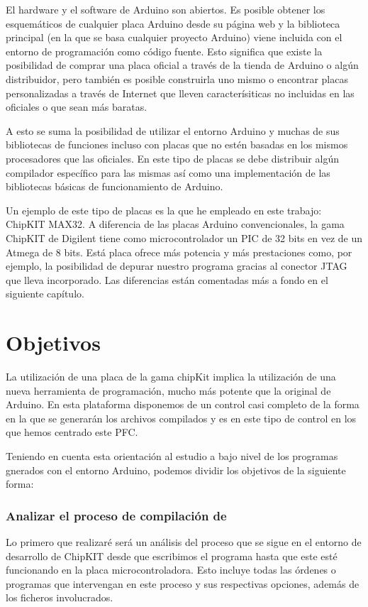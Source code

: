 El hardware y el software de Arduino son abiertos.  Es posible obtener los esquemáticos de cualquier placa Arduino desde su página web y la biblioteca principal (en la que se basa cualquier proyecto Arduino) viene incluida con el entorno de programación como código fuente.  Esto significa que existe la posibilidad de comprar una placa oficial a través de la tienda de Arduino o algún distribuidor, pero también es posible construirla uno mismo o encontrar placas personalizadas a través de Internet que lleven caracterísiticas no incluidas en las oficiales o que sean más baratas.

A esto se suma la posibilidad de utilizar el entorno Arduino y muchas de sus bibliotecas de funciones incluso con placas que no estén basadas en los mismos procesadores que las oficiales. En este tipo de placas se debe distribuir algún compilador específico para las mismas así como una implementación de las bibliotecas básicas de funcionamiento de Arduino.

Un ejemplo de este tipo de placas es la que he empleado en este trabajo: ChipKIT MAX32.  A diferencia de las placas Arduino convencionales, la gama ChipKIT de Digilent tiene como microcontrolador un PIC de 32 bits en vez de un Atmega de 8 bits.  Está placa ofrece más potencia y más prestaciones como, por ejemplo, la posibilidad de depurar nuestro programa gracias al conector JTAG que lleva incorporado. Las diferencias están comentadas más a fondo en el siguiente capítulo.

\section{Objetivos}
La utilización de una placa de la gama chipKit implica la utilización de una nueva herramienta de programación, mucho más potente que la original de Arduino. En esta plataforma disponemos de un control casi completo de la forma en la que se generarán los archivos compilados y es en este tipo de control en los que hemos centrado este PFC.

Teniendo en cuenta esta orientación al estudio a bajo nivel de los programas gnerados con el entorno Arduino, podemos dividir los objetivos de la siguiente forma:

\subsubsection{Analizar el proceso de compilación de }
Lo primero que realizaré será un análisis del proceso que se sigue en el entorno de desarrollo de ChipKIT desde que escribimos el programa hasta que este esté funcionando en la placa microcontroladora.  Esto incluye todas las órdenes o programas que intervengan en este proceso y sus respectivas opciones, además de los ficheros involucrados.

